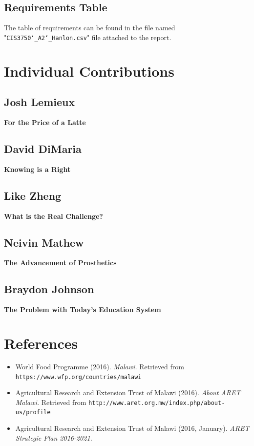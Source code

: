 \documentclass[12pt,letterpaper]{article}
\begin{document}
\subsection{Requirements Table}
The table of requirements can be found in the file named "\texttt{CIS3750\char`_A2\char`_Hanlon.csv}" file attached to the report.

\clearpage
\section{Individual Contributions}
\subsection{Josh Lemieux}
\textbf{For the Price of a Latte}\par


\clearpage
\subsection{David DiMaria}
\textbf{Knowing is a Right}

\clearpage
\subsection{Like Zheng}
\textbf{What is the Real Challenge?}\par


\clearpage
\subsection{Neivin Mathew}
\textbf{The Advancement of Prosthetics}\par

\clearpage
\subsection{Braydon Johnson}
\textbf{The Problem with Today's Education System}\par


\clearpage
\section{References}
\begin{flushleft}
\begin{itemize}[leftmargin=12pt]

\item World Food Programme (2016). \emph{Malawi.}
 Retrieved from \texttt{https://www.wfp.org/countries/malawi}

\item Agricultural Research and Extension Trust of Malawi (2016). \emph{About ARET Malawi.}
Retrieved from \texttt{http://www.aret.org.mw/index.php/about-us/profile}

\item Agricultural Research and Extension Trust of Malawi (2016, January). \emph{ARET Strategic Plan 2016-2021.}


\end{itemize}
\end{flushleft}   
\end{document}

